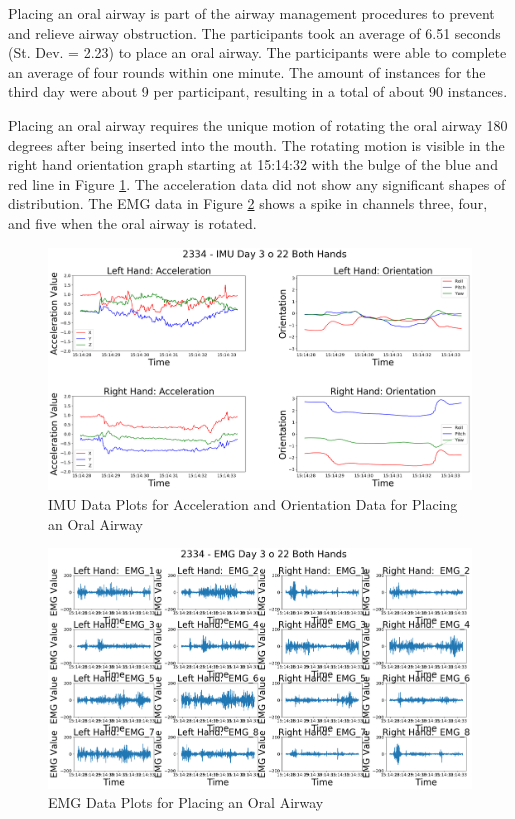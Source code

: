 Placing an oral airway is part of the airway management procedures to prevent and relieve airway obstruction. The participants took an average of 6.51 seconds (St. Dev. = 2.23) to place an oral airway. The participants were able to complete an average of four rounds within one minute. The amount of instances for the third day were about 9 per participant, resulting in a total of about 90 instances.
\par Placing an oral airway requires the unique motion of rotating the oral airway 180 degrees after being inserted into the mouth. The rotating motion is visible in the right hand orientation graph starting at 15:14:32 with the bulge of the blue and red line in Figure \ref{fig:2334imuday3o22}. The acceleration data did not show any significant shapes of distribution. The EMG data in Figure \ref{fig:2334emgday3o22} shows a spike in channels three, four, and five when the oral airway is rotated.
\begin{figure}[!h]
	\centering
	\includegraphics[width=\linewidth]{pictures/2334_IMU_Day3_o_22}
	\caption{IMU Data Plots for Acceleration and Orientation Data for Placing an Oral Airway}
	\label{fig:2334imuday3o22}
\end{figure}
\begin{figure}[!h]
	\centering
	\includegraphics[width=\linewidth]{pictures/2334_EMG_Day3_o_22}
	\caption{EMG Data Plots for Placing an Oral Airway}
	\label{fig:2334emgday3o22}
\end{figure}

